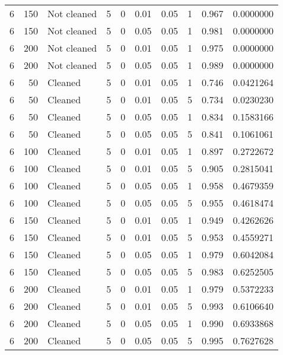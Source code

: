 \begin{table}
{{\begin{tabular}{rrlrrrrrrr}
\hspace{1em}6 & 150 & Not cleaned & 5 & 0 & 0.01 & 0.05 & 1 & 0.967 & 0.0000000\\
\hspace{1em}6 & 150 & Not cleaned & 5 & 0 & 0.05 & 0.05 & 1 & 0.981 & 0.0000000\\
\hspace{1em}6 & 200 & Not cleaned & 5 & 0 & 0.01 & 0.05 & 1 & 0.975 & 0.0000000\\
\hspace{1em}6 & 200 & Not cleaned & 5 & 0 & 0.05 & 0.05 & 1 & 0.989 & 0.0000000\\
\hspace{1em}6 & 50 & Cleaned & 5 & 0 & 0.01 & 0.05 & 1 & 0.746 & 0.0421264\\
\hspace{1em}6 & 50 & Cleaned & 5 & 0 & 0.01 & 0.05 & 5 & 0.734 & 0.0230230\\
\hspace{1em}6 & 50 & Cleaned & 5 & 0 & 0.05 & 0.05 & 1 & 0.834 & 0.1583166\\
\hspace{1em}6 & 50 & Cleaned & 5 & 0 & 0.05 & 0.05 & 5 & 0.841 & 0.1061061\\
\hspace{1em}6 & 100 & Cleaned & 5 & 0 & 0.01 & 0.05 & 1 & 0.897 & 0.2722672\\
\hspace{1em}6 & 100 & Cleaned & 5 & 0 & 0.01 & 0.05 & 5 & 0.905 & 0.2815041\\
\hspace{1em}6 & 100 & Cleaned & 5 & 0 & 0.05 & 0.05 & 1 & 0.958 & 0.4679359\\
\hspace{1em}6 & 100 & Cleaned & 5 & 0 & 0.05 & 0.05 & 5 & 0.955 & 0.4618474\\
\hspace{1em}6 & 150 & Cleaned & 5 & 0 & 0.01 & 0.05 & 1 & 0.949 & 0.4262626\\
\hspace{1em}6 & 150 & Cleaned & 5 & 0 & 0.01 & 0.05 & 5 & 0.953 & 0.4559271\\
\hspace{1em}6 & 150 & Cleaned & 5 & 0 & 0.05 & 0.05 & 1 & 0.979 & 0.6042084\\
\hspace{1em}6 & 150 & Cleaned & 5 & 0 & 0.05 & 0.05 & 5 & 0.983 & 0.6252505\\
\hspace{1em}6 & 200 & Cleaned & 5 & 0 & 0.01 & 0.05 & 1 & 0.979 & 0.5372233\\
\hspace{1em}6 & 200 & Cleaned & 5 & 0 & 0.01 & 0.05 & 5 & 0.993 & 0.6106640\\
\hspace{1em}6 & 200 & Cleaned & 5 & 0 & 0.05 & 0.05 & 1 & 0.990 & 0.6933868\\
\hspace{1em}6 & 200 & Cleaned & 5 & 0 & 0.05 & 0.05 & 5 & 0.995 & 0.7627628\\
\bottomrule
\end{tabular}
}}
 \end{table}
